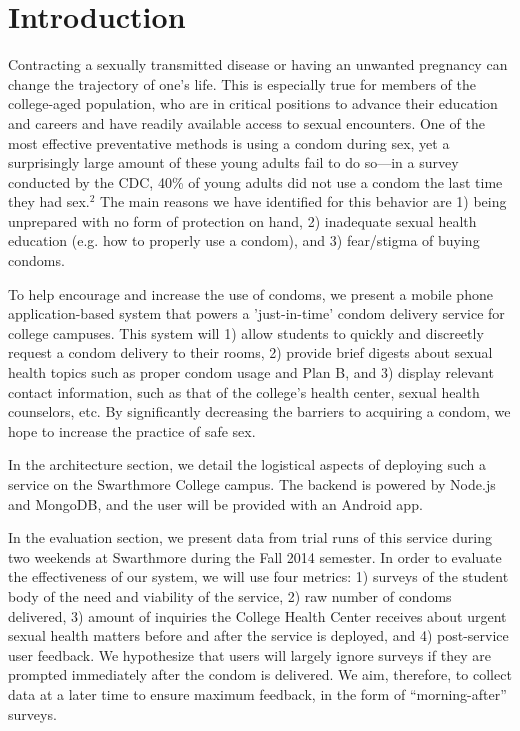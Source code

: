 \documentclass{acm_proc_article-sp}
\begin{document}
\section{Introduction}
\smallskip
Contracting a sexually transmitted disease or having an unwanted pregnancy can change the trajectory of one's life. This is especially true for members of the college-aged population, who are in critical positions to advance their education and careers and have readily available access to sexual encounters. One of the most effective preventative methods is using a condom during sex, yet a surprisingly large amount of these young adults fail to do so---in a survey conducted by the CDC, 40\% of young adults did not use a condom the last time they had sex.$^2$ The main reasons we have identified for this behavior are 1) being unprepared with no form of protection on hand, 2) inadequate sexual health education (e.g. how to properly use a condom), and 3) fear/stigma of buying condoms.

To help encourage and increase the use of condoms, we present a mobile phone application-based system that powers a 'just-in-time' condom delivery service for college campuses. This system will 1) allow students to quickly and discreetly request a condom delivery to their rooms, 2) provide brief digests about sexual health topics such as proper condom usage and Plan B, and 3) display relevant contact information, such as that of the college's health center, sexual health counselors, etc. By significantly decreasing the barriers to acquiring a condom, we hope to increase the practice of safe sex.

In the architecture section, we detail the logistical aspects of deploying such a service on the Swarthmore College campus. The backend is powered by Node.js and MongoDB, and the user will be provided with an Android app.

In the evaluation section, we present data from trial runs of this service during two weekends at Swarthmore during the Fall 2014 semester. In order to evaluate the effectiveness of our system, we will use four metrics: 1) surveys of the student body of the need and viability of the service, 2) raw number of condoms delivered, 3) amount of inquiries the College Health Center receives about urgent sexual health matters before and after the service is deployed, and 4) post-service user feedback. We hypothesize that users will largely ignore surveys if they are prompted immediately after the condom is delivered. We aim, therefore, to collect data at a later time to ensure maximum feedback, in the form of ``morning-after'' surveys.
\end{document}
